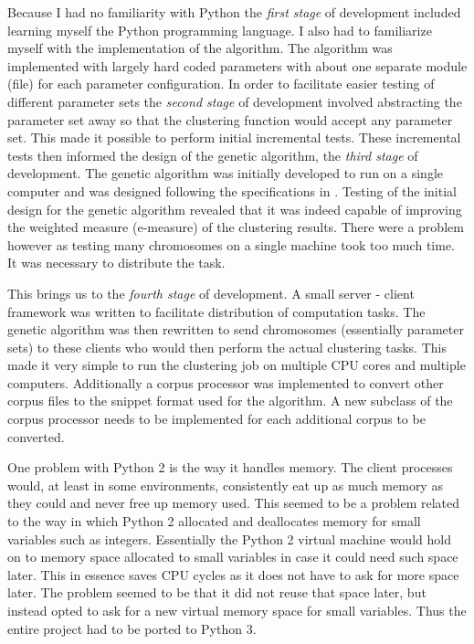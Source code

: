 Because I had no familiarity with Python the \emph{first stage} of development included learning myself the Python programming language. I also had to familiarize myself with the implementation of the \CTC algorithm. The algorithm was implemented with largely hard coded parameters with about one separate module (file) for each parameter configuration. In order to facilitate easier testing of different parameter sets the \emph{second stage} of development involved abstracting the parameter set away so that the clustering function would accept any parameter set. This made it possible to perform initial incremental tests. These incremental tests then informed the design of the genetic algorithm, the \emph{third stage} of development. The genetic algorithm was initially developed to run on a single computer and was designed following the specifications in \cite{Goldberg1989,Negnevitsky2002,Haupt2004a}. Testing of the initial design for the genetic algorithm revealed that it was indeed capable of improving the weighted measure (e-measure) of the clustering results. There were a problem however as testing many chromosomes on a single machine took too much time. It was necessary to distribute the task.

This brings us to the \emph{fourth stage} of development. A small server - client framework was written to facilitate distribution of computation tasks. The genetic algorithm was then rewritten to send chromosomes (essentially parameter sets) to these clients who would then perform the actual clustering tasks. This made it very simple to run the clustering job on multiple CPU cores and multiple computers. Additionally a corpus processor was implemented to convert other corpus files to the snippet format used for the \CTC algorithm. A new subclass of the corpus processor needs to be implemented for each additional corpus to be converted.

One problem with Python 2 is the way it handles memory. The client processes would, at least in some environments, consistently eat up as much memory as they could and never free up memory used. This seemed to be a problem related to the way in which Python 2 allocated and deallocates memory for small variables such as integers. Essentially the Python 2 virtual machine would hold on to memory space allocated to small variables in case it could need such space later. This in essence saves CPU cycles as it does not have to ask for more space later. The problem seemed to be that it did not reuse that space later, but instead opted to ask for a new virtual memory space for small variables. Thus the entire project had to be ported to Python 3.

